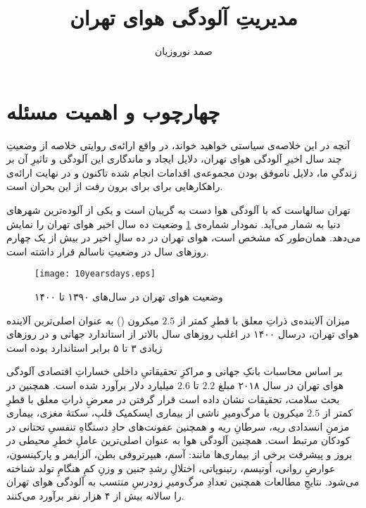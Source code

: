 \documentclass[12pt]{atu}
\title{ مدیریتِ آلودگی هوای تهران}
\author{صمد نوروزیان}
\begin{document}
\maketitle

\section{چهارچوب و اهمیت مسئله}
آنچه در این خلاصه‌ی سیاستی خواهید خواند، در واقع ارائه‌ی روایتی خلاصه از وضعیتِ چند سال اخیرِ آلودگی هوای تهران، دلایل ایجاد و ماندگاری این آلودگی و تاثیرِ آن بر زندگیِ ما، دلایل ناموفق بودن مجموعه‌ی اقدامات انجام شده تاکنون و در نهایت ارائه‌ی راهکارهایی برای برای برون رفت از این بحران است.


تهران سالهاست که با آلودگی هوا دست به گریبان است و یکی از آلوده‌ترین شهر‌های دنیا به شمار می‌آید.\cite{tehranairworldbank}
نمودار شماره‌ی
\ref{fig:10yearsdays}
وضعیت ده سال اخیر هوای تهران را نمایش می‌دهد. همان‌طور که مشخص است، هوای تهران در ده سالِ اخیر در بیش از یک چهارم روزهای سال در وضعیتِ ناسالم
قرار داشته است.
\vspace{-0.3cm}
\begin{figure}[!ht]
	\centering
	\texttt{[image: 10yearsdays.eps]}
	\caption{وضعیت هوای تهران در سال‌های ۱۳۹۰ تا ۱۴۰۰} \label{fig:10yearsdays}
\end{figure}
\vspace{-0.3cm}
میزان آلاینده‌ی ذراتِ معلق با قطرِ کمتر از $2.5$ میکرون 
{\scriptsize () }
به عنوان اصلی‌ترین آلاینده هوای تهران، درسال ۱۴۰۰ در اغلب روزهای سال بالاتر از استاندارد جهانی و در روزهای زیادی ۳ تا ۵ برابر استاندارد بوده است 
\cite{tehranair1400}

بر اساس محاسبات بانکِ جهانی و مراکزِ تحقیقاتیِ داخلی خساراتِ اقتصادی آلودگی هوای تهران در سال ۲۰۱۸ مبلغ $2.2$  تا $2.6$  میلیارد دلار برآورد شده است.\cite{Faridi2022-rz} 
همچنین در بحث سلامت، تحقیقات نشان داده است قرار گرفتن در معرضِ ذراتِ معلق با قطرِ کمتر از $2.5$ میکرون با مرگ‌و‌میرِ ناشی از بیماری ایسکمیک قلب، سکتهٔ مغزی، بیماری مزمنِ انسدادی ریه، سرطانِ ریه و همچنین عفونت‌های حادِ دستگاهِ تنفسیِ تحتانی در کودکان مرتبط است. همچنین آلودگی هوا به عنوان اصلی‌ترین عاملِ خطرِ محیطی در بروز و پیشرفت برخی از بیماری‌ها مانند: آسم، هیپرتروفی بطن، آلزایمر و پارکینسون، عوارضِ روانی، اُوتیسم، رتینوپاتی، اختلالِ رشدِ جنین و وزنِ کمِ هنگامِ تولد شناخته می‌شود.\cite{Ghorani-Azam2016-xh} 
\cite{salamat1395}
نتایجِ مطالعات همچنین تعدادِ مرگ‌ومیرِ زودرسِ منتسب به آلودگی هوای تهران را سالانه بیش از ۴ هزار نفر برآورد می‌کنند.
\cite{tehranairworldbank}
\end{document}
